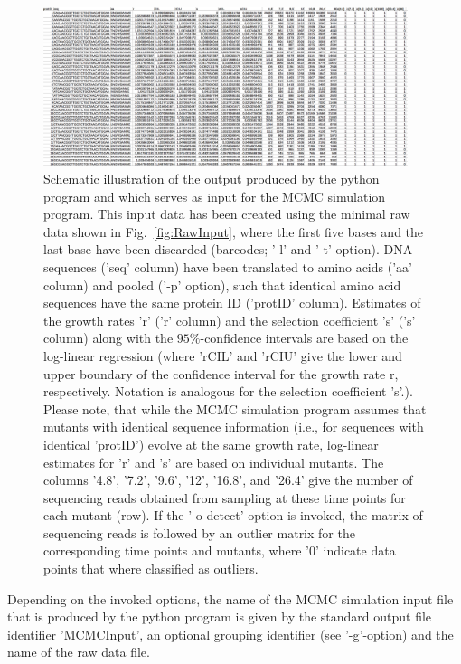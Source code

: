 \documentclass[12pt,a4paper]{scrartcl}
\begin{document}
\begin{figure}
\centering \includegraphics[width=0.95\textwidth]{MCMC-InputExample.png}
\caption{Schematic illustration of the output produced by the python program and which serves as input for the MCMC simulation program. This input data has been created using the minimal raw data shown in Fig.~\ref{fig:RawInput}, where the first five bases and the last base have been discarded (barcodes; '-l' and '-t' option). DNA sequences ('seq' column) have been translated to amino acids ('aa' column) and pooled ('-p' option), such that identical amino acid sequences have the same protein ID ('protID' column). Estimates of the growth rates 'r' ('r' column) and the selection coefficient 's' ('s' column) along with the $95\%$-confidence intervals are based on the log-linear regression (where 'rCIL' and 'rCIU' give the lower and upper boundary of the confidence interval for the growth rate r, respectively. Notation is analogous for the selection coefficient 's'.). Please note, that while the MCMC simulation program assumes that mutants with identical sequence information (i.e., for sequences with identical 'protID') evolve at the same growth rate, log-linear estimates for 'r' and 's' are based on individual mutants.
The columns '4.8', '7.2', '9.6', '12', '16.8', and '26.4' give the number of sequencing reads obtained from sampling at these time points for each mutant (row). If the '-o detect'-option is invoked, the matrix of sequencing reads is followed by an outlier matrix for the corresponding time points and mutants, where '0' indicate data points that where classified as outliers.\label{fig:PythonOutput}}
\end{figure}

Depending on the invoked options, the name of the MCMC simulation input file that is produced by the python program is given by the standard output file identifier 'MCMCInput', an optional grouping identifier (see '-g'-option) and the name of the raw data file.
\end{document}
